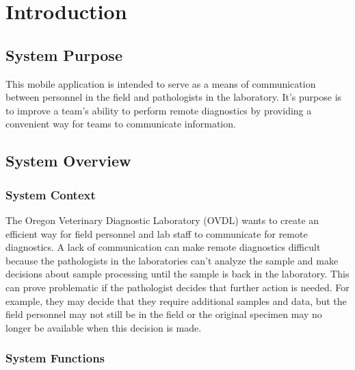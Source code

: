 \documentclass[onecolumn, draftclsnofoot,10pt, compsoc]{IEEEtran}
\begin{document}
\begin{titlepage}
\begin{singlespace}
\begin{abstract}
        \end{abstract}     
    \end{singlespace}
\end{titlepage}
\newpage
{}
\tableofcontents
\clearpage

\section{Introduction}
\subsection{System Purpose}
This mobile application is intended to serve as a means of communication between personnel in the field and pathologists in the laboratory. 
It's purpose is to improve a team's ability to perform remote diagnostics by providing a convenient way for teams to communicate information.

\subsection{System Overview}


\subsubsection{System Context}
The Oregon Veterinary Diagnostic Laboratory (OVDL) wants to create an efficient way for field personnel and lab staff to communicate for remote diagnostics. 
A lack of communication can make remote diagnostics difficult because the pathologists in the laboratories can't analyze the sample and make decisions about sample processing until the sample is back in the laboratory. 
This can prove problematic if the pathologist decides that further action is needed. 
For example, they may decide that they require additional samples and data, but the field personnel may not still be in the field or the original specimen may no longer be available when this decision is made.

\subsubsection{System Functions}
\end{document}
